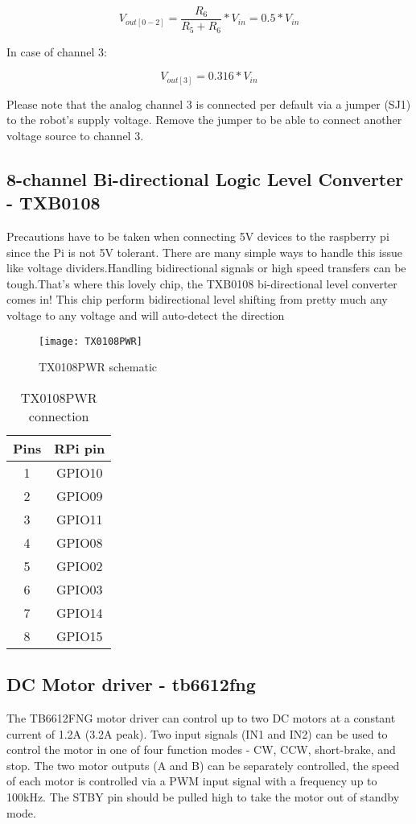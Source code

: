 \documentclass[
12pt, %
a4paper, %
oneside, %
headinclude,footinclude, %
BCOR5mm, %
]{scrartcl}
\begin{document}
\[ V_{ out[0-2] } = \frac{ R_{6} }{ R_{5} + R_{6} } * V_{in}  = 0.5* V_{in}\]

In case of channel 3:

\[ V_{out[3]} = 0.316 * V_{in}\]

Please note that the analog channel 3 is connected per default via a jumper (SJ1) to the robot's supply voltage. Remove the jumper to be able to connect another voltage source to channel 3. 

\subsection{8-channel Bi-directional Logic Level Converter - TXB0108}
Precautions have to be taken when connecting 5V devices to the raspberry pi since the Pi is not 5V tolerant. There are many simple ways to handle this issue like voltage dividers.Handling bidirectional signals or high speed transfers can be tough.That's where this lovely chip, the TXB0108 bi-directional level converter comes in! This chip perform bidirectional level shifting from pretty much any voltage to any voltage and will auto-detect the direction 

\begin{figure}[!htb]
\centering
\texttt{[image: TX0108PWR]} 
\caption[TX0108PWR schematic]{TX0108PWR schematic}
\label{fig:TX0108PWR}
\end{figure}

\begin{table}[hbt]
\caption{TX0108PWR connection}
\centering
\begin{tabular}{cc}
\toprule
Pins & RPi pin \\
\midrule
1  & GPIO10 \\
2  & GPIO09 \\
3  & GPIO11 \\
4  & GPIO08 \\
5  & GPIO02 \\
6  & GPIO03 \\
7  & GPIO14 \\
8  & GPIO15 \\
\bottomrule
\end{tabular}
\label{tab:label}
\end{table}
\subsection {DC Motor driver - tb6612fng}
The TB6612FNG motor driver can control up to two DC motors at a constant current of 1.2A (3.2A peak). Two input signals (IN1 and IN2) can be used to control the motor in one of four function modes - CW, CCW, short-brake, and stop. The two motor outputs (A and B) can be separately controlled, the speed of each motor is controlled via a PWM input signal with a frequency up to 100kHz. The STBY pin should be pulled high to take the motor out of standby mode.
\end{document}
